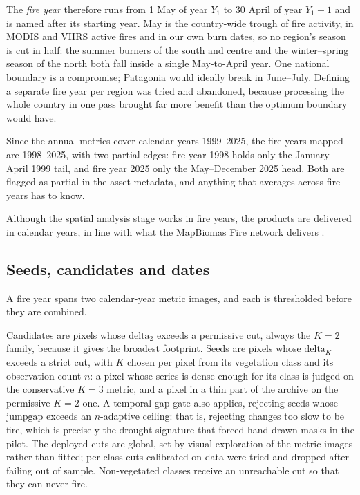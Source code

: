 \documentclass[11pt,a4paper]{article}
\begin{document}
The \emph{fire year} therefore runs from 1 May of year \(Y_1\) to 30 April of year \(Y_1+1\) and is
named after its starting year. May is the country-wide trough of fire activity, in MODIS and VIIRS
active fires and in our own burn dates, so no region's season is cut in half: the summer burners
of the south and centre and the winter--spring season of the north both fall inside a single
May-to-April year. One national boundary is a compromise; Patagonia would ideally break in June--July. 
Defining a separate fire year per region was tried and abandoned, because processing the
whole country in one pass brought far more benefit than the optimum boundary would have.

Since the annual metrics cover calendar years 1999--2025, the fire years mapped are 1998--2025,
with two partial edges: fire year 1998 holds only the January--April 1999 tail, and fire year 2025
only the May--December 2025 head. Both are flagged as partial in the asset metadata, and anything
that averages across fire years has to know.

Although the spatial analysis stage works in fire years, the products are delivered in calendar years,
in line with what the MapBiomas Fire network delivers \parencite{alencar2022mapbiomas_fire}.

\subsection{Seeds, candidates and dates}

A fire year spans two calendar-year metric images, and each is thresholded before they are
combined.

Candidates are pixels whose \(\mathrm{delta}_2\) exceeds a permissive cut, always the \(K=2\)
family, because it gives the broadest footprint. Seeds are pixels whose \(\mathrm{delta}_K\)
exceeds a strict cut, with \(K\) chosen per pixel from its vegetation class and its observation
count \(n\): a pixel whose series is dense enough for its class is judged on the conservative
\(K=3\) metric, and a pixel in a thin part of the archive on the permissive \(K=2\) one. A
temporal-gap gate also applies, rejecting seeds whose \(\mathrm{jumpgap}\) exceeds an
\(n\)-adaptive ceiling: that is, rejecting changes too slow to be fire, which is precisely the
drought signature that forced hand-drawn masks in the pilot. The deployed cuts are global, set by
visual exploration of the metric images rather than fitted; per-class cuts calibrated on data were
tried and dropped after failing out of sample. Non-vegetated classes receive an unreachable cut so
that they can never fire.
\end{document}

